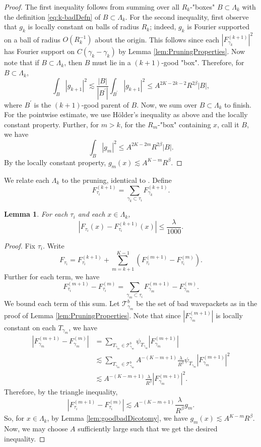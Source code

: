 \documentclass[12pt]{amsart}
\newtheorem{lemma}[theorem]{Lemma}
\providecommand{\T}{\mathcal{T}}
\begin{document}
\begin{proof}
    The first inequality follows from summing over all $R_{k}$-"boxes" $B\subset \Lambda_k$ with the definition \eqref{eq:k-badDefn} of $B\subset \Lambda_k$. For the second inequality, first observe that $g_k$ is locally constant on balls of radius $R_k$; indeed, $g_k$ is Fourier supported on a ball of radius $O(R_k^{-1})$ about the origin. This follows since each $|F_{\gamma_k}^{(k+1)}|^2$ has Fourier support on $C(\gamma_k-\gamma_k)$ by Lemma \ref{lem:PruningProperties}. Now note that if $B\subset \Lambda_k$, then $B$ must lie in a $(k+1)$-good "box". Therefore, for $B\subset \Lambda_k$, $$\int_{B}|g_{k+1}|^2 \lesssim \frac{|B|}{|B^\prime|}\int_{B^\prime}|g_{k+1}|^2\le A^{2K-2k-2}R^{2\beta}|B|,$$ where $B^\prime$ is the $(k+1)$-good parent of $B$. Now, we sum over $B\subset \Lambda_k$ to finish. 
    For the pointwise estimate, we use H\"{o}lder's inequality as above and the locally constant property. Further, for $m>k$, for the $R_m$-"box" containing $x$, call it $B$, we have $$\int_B |g_m|^2\le A^{2K-2m}R^{2\beta}|B|.$$ By the locally constant property, $g_m(x)\lesssim A^{K-m}R^{\beta}$. 
\end{proof}

We relate each $\Lambda_k$ to the pruning, identical to \cite[Lemma 5]{Guth_2024}. Define $$F_{\tau_i}^{(k+1)}= \sum_{\gamma_k\subset \tau_i}F_{\gamma_k}^{(k+1)}.$$

\begin{lemma}\label{lem:PassToPruned}
    For each $\tau_i$ and each $x\in \Lambda_k$, $$|F_{\tau_i}(x) - F_{\tau_i}^{(k+1)
    }(x)|\le \frac{\lambda}{1000}.$$
\end{lemma}

\begin{proof}
    Fix $\tau_i$. Write $$F_{\tau_i} = F^{(k+1)}_{\tau_i} + \sum_{m=k+1}^{K-1}(F_{\tau_i}^{(m+1)}-F_{\tau_i}^{(m)}).$$ Further for each term, we have $$F_{\tau_i}^{(m+1)}-F_{\tau_i}^{(m)}= \sum_{\gamma_m\subset \tau_i}F_{\gamma_m}^{(m+1)}-F_{\gamma_m}^{(m)}.$$ We bound each term of this sum. Let $\T^b_{\gamma_m}$ be the set of bad wavepackets as in the proof of Lemma \ref{lem:PruningProperties}.  Note that since $|F_{\gamma_m}^{(m+1)}|$ is locally constant on each $T_{\gamma_m}$, we have \begin{align*}
        |F_{\gamma_m}^{(m+1)}-F_{\gamma_m}^{(m)}| &= \sum_{T_{\gamma_m}\in \T^b_{\gamma_m}}\psi_{T_{\gamma_m}}|F_{\gamma_m}^{(m+1)}|\\
        &\lesssim \sum_{T_{\gamma_m}\in \T^b_{\gamma_m}}A^{-(K-m+1)}\frac{\lambda}{R^{\beta}}\psi_{T_{\gamma_m}}|F_{\gamma_m}^{(m+1)}|^2\\
        &\lesssim A^{-(K-m+1)}\frac{\lambda}{R^{\beta}}|F_{\gamma_m}^{(m+1)}|^2.
    \end{align*} Therefore, by the triangle inequality, $$|F_{\tau_i}^{(m+1)}-F_{\tau_i}^{(m)}|\lesssim A^{-(K-m+1)}\frac{\lambda}{R^{\beta}}g_m.$$ So, for $x\in \Lambda_k$, by Lemma \ref{lem:goodbadDicotomy}, we have $g_m(x)\lesssim A^{K-m}R^{\beta}$. Now, we may choose $A$ sufficiently large such that we get the desired inequality.
\end{proof}
\end{document}
